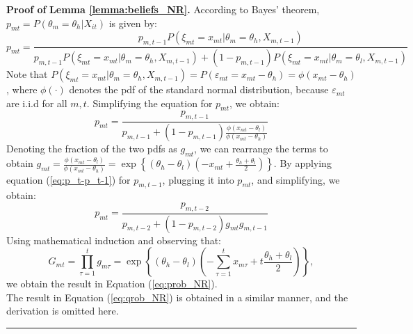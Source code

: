 \documentclass[12pt]{article}
\newenvironment{proof}[1][Proof of]{\noindent\textbf{#1} }{\ \rule{0.5em}{0.5em}}
\begin{document}
\begin{proof}
    \textbf{Lemma \ref{lemma:beliefs_NR}.}
    According to Bayes' theorem, $p_{mt} = P(\theta_{m}=\theta_h \vert X_{it})$ is given by:
    \begin{equation*}\label{eq:lemma_alpha_it_proof_1}
        p_{mt} = 
        \frac{p_{m,t-1}P(\xi_{mt} = x_{mt} \vert \theta_{m}=\theta_h, X_{m,t-1})}
        {p_{m,t-1}P(\xi_{mt} = x_{mt} \vert \theta_{m}=\theta_h, X_{m,t-1})
        +(1-p_{m,t-1})P(\xi_{mt} = x_{mt} \vert \theta_{m}=\theta_l, X_{m,t-1})}
    \end{equation*}
    Note that $P(\xi_{mt} = x_{mt} \vert \theta_{m}=\theta_h, X_{m,t-1}) = P(\varepsilon_{mt} = x_{mt} - \theta_h) = \phi(x_{mt} - \theta_h)$, where $\phi(\cdot)$ denotes the pdf of the standard normal distribution, because $\varepsilon_{mt}$ are i.i.d for all $m, t$. Simplifying the equation for $p_{mt}$, we obtain:
    \begin{equation}\label{eq:p_t-p_t-1}
        p_{mt} = \frac{p_{m,t-1}}{p_{m,t-1} + (1 - p_{m,t-1})\frac{\phi(x_{mt}-\theta_l)}{\phi(x_{mt}-\theta_h)}} 
    \end{equation}
    Denoting the fraction of the two pdfs as $g_{mt}$, we can rearrange the terms to obtain $g_{mt} = \frac{\phi(x_{mt}-\theta_l)}{\phi(x_{mt}-\theta_h)} = \exp \left\lbrace \left(\theta_h - \theta_l\right)\left(-x_{mt} + \frac{\theta_h + \theta_l}{2}\right)\right\rbrace$. By applying equation (\ref{eq:p_t-p_t-1}) for $p_{m,t-1}$, plugging it into $p_{mt}$, and simplifying, we obtain:
    \begin{equation*}
        p_{mt} = \frac{p_{m,t-2}}{p_{m,t-2} + (1 - p_{m,t-2})g_{mt}g_{m,t-1}} 
    \end{equation*}
    Using mathematical induction and observing that:
    \begin{equation*}
        G_{mt} = \prod^{t}_{\tau=1}g_{m\tau} = \exp \left\lbrace \left(\theta_h - \theta_l\right)\left(-\sum^{t}_{\tau = 1}x_{m\tau} + t\frac{\theta_h + \theta_l}{2}\right)\right\rbrace,
    \end{equation*}
    we obtain the result in Equation (\ref{eq:prob_NR}).\\
    The result in Equation (\ref{eq:qrob_NR}) is obtained in a similar manner, and the derivation is omitted here.
\end{proof}
\end{document}
